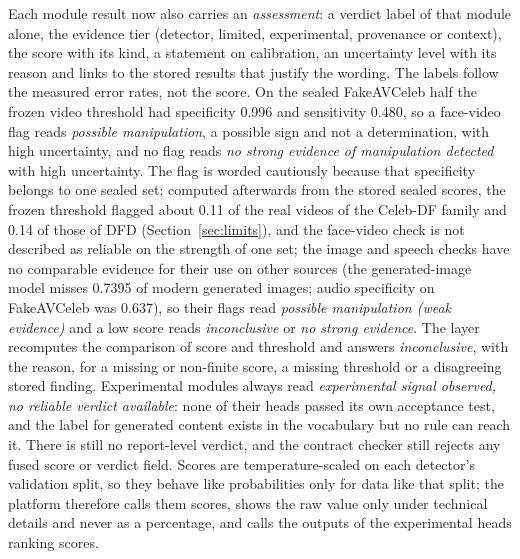 \documentclass[conference,a4paper]{IEEEtran_nodash}
\begin{document}
Each module result now also carries an \emph{assessment}: a verdict
label of that module alone, the evidence tier (detector, limited, experimental,
provenance or context), the score with its kind, a statement on calibration, an
uncertainty level with its reason and links to the stored results that justify
the wording. The labels follow the measured error rates, not the score. On the
sealed FakeAVCeleb half the frozen video threshold had specificity 0.996 and
sensitivity 0.480, so a face-video flag reads \emph{possible manipulation}, a
possible sign and not a determination, with high uncertainty, and no flag reads
\emph{no strong evidence of manipulation detected} with high uncertainty. The
flag is worded cautiously because that specificity belongs to one sealed set:
computed afterwards from the stored sealed scores, the frozen threshold flagged
about 0.11 of the real videos of the Celeb-DF family and 0.14 of those of DFD
(Section~\ref{sec:limits}), and the face-video check is not described as
reliable on the strength of one set; the image and speech checks have no comparable evidence for their
use on other sources (the generated-image model misses 0.7395 of modern generated
images; audio specificity on FakeAVCeleb was 0.637), so their flags read
\emph{possible manipulation (weak evidence)} and a low score reads
\emph{inconclusive} or \emph{no strong evidence}. The layer recomputes the
comparison of score and threshold and answers \emph{inconclusive}, with the
reason, for a missing or non-finite score, a missing threshold or a disagreeing
stored finding. Experimental modules always read \emph{experimental signal
observed, no reliable verdict available}: none of their heads passed its own
acceptance test, and the label for generated content exists in the vocabulary
but no rule can reach it. There is still no report-level verdict, and the
contract checker still rejects any fused score or verdict field. Scores are
temperature-scaled on each detector's validation split, so they behave like
probabilities only for data like that split; the platform therefore calls them
scores, shows the raw value only under technical details and never as a
percentage, and calls the outputs of the experimental heads ranking scores. %
\end{document}
